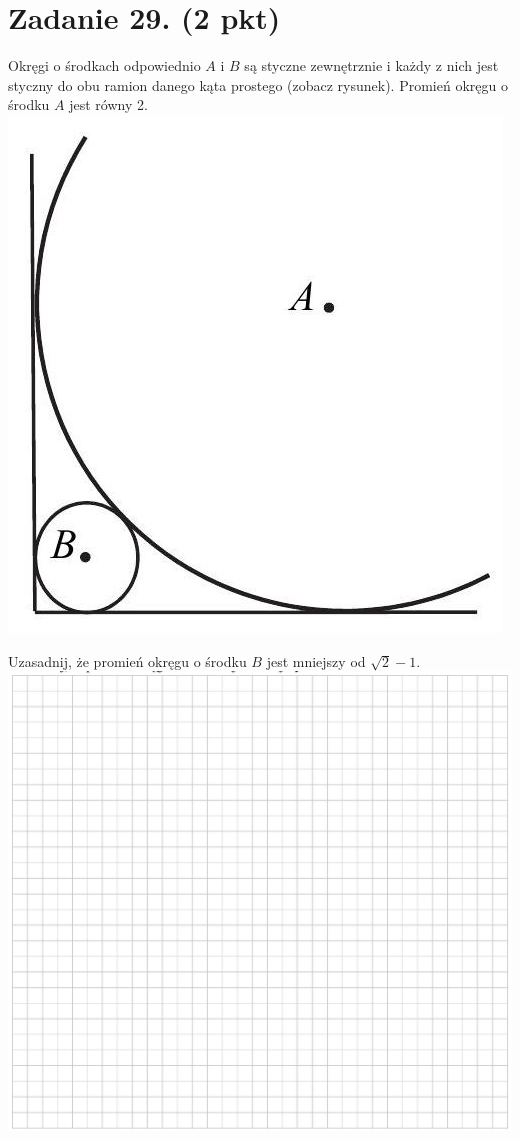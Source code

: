 \documentclass[10pt]{article}
\begin{document}
\section*{Zadanie 29. (2 pkt)}
Okręgi o środkach odpowiednio \(A\) i \(B\) są styczne zewnętrznie i każdy z nich jest styczny do obu ramion danego kąta prostego (zobacz rysunek). Promień okręgu o środku \(A\) jest równy 2.\\
\includegraphics[max width=\textwidth, center]{2024_11_21_9383c97fb44abf35abe9g-17}

Uzasadnij, że promień okręgu o środku \(B\) jest mniejszy od \(\sqrt{2}-1\).\\
\includegraphics[max width=\textwidth, center]{2024_11_21_9383c97fb44abf35abe9g-17(1)}
\end{document}

